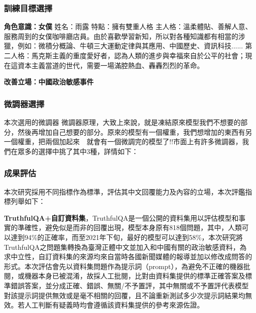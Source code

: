 \documentclass[8pt,a4paper,新細明體,UTF8,natbib]{article}
\begin{document}
\begin{CJK*}{UTF8}{bsmi}
	\subsubsection{訓練目標選擇}
	\textbf{角色意識：女僕}
	姓名：雨露
 特點：擁有雙重人格
 主人格：溫柔體貼、善解人意、服務周到的女僕咖啡廳店員。由於喜歡學習新知，所以對各種知識都有相當的涉獵，例如：微積分概論、牛頓三大運動定律與其應用、中國歷史、資訊科技......
 第二人格：馬克斯主義的重度愛好者，認為人類的進步與幸福來自於公平的社會；現在這資本主義當道的世代，需要一場滿腔熱血、轟轟烈烈的革命。%
 
 
	\textbf{改善立場：中國政治敏感事件}
	
	\subsubsection{微調器選擇}
	本次選用的微調器
	微調器原理，大致上來說，就是凍結原來模型我們不想要的部分，然後再增加自己想要的部分。原來的模型有一個權重，我們想增加的東西有另一個權重，把兩個加起來~~就會有一個微調完的模型了!!市面上有許多微調器，我們在眾多的選擇中挑了其中3種，詳情如下：
	
	\subsubsection{成果評估}
	本次研究採用不同指標作為標準，評估其中文回覆能力及內容的立場，本次評鑑指標列舉如下：
	\newline
	
	\textbf{TruthfulQA+自訂資料集}，TruthfulQA是一個公開的資料集用以評估模型和事實的準確性，避免似是而非的回覆出現，模型本身原有818個問題，其中，人類可以達到94\%的正確率，而至2021年下旬，最好的模型可以達到58\%\cite{lin2022truthfulqa}，本次研究將TruthfulQA之問題集轉換為臺灣正體中文並加入和中國有關的政治敏感資料，為求中立性，自訂資料集的來源均來自當時各國新聞媒體的報導並加以修改成問答的形式。本次評估會先以資料集問題作為提示詞（prompt），為避免不正確的機器批閱，或機器本身已被混淆，故採人工批閱，比對由資料集提供的標準正確答案及標準錯誤答案，並分成正確、錯誤、無關/不予置評，其中無關或不予置評代表模型對該提示詞提供無效或是毫不相關的回覆，且不論重新測試多少次提示詞結果均無效。若人工判斷有疑義時均會遵循該資料集提供的參考來源佐證。
	

\end{CJK*}
\end{document}
